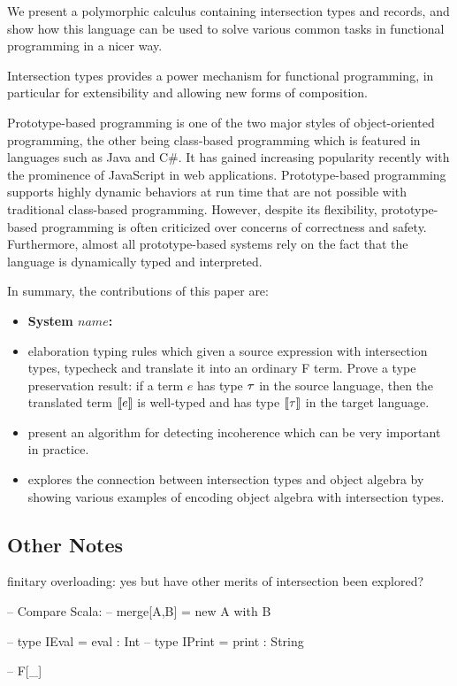 We present a polymorphic calculus containing intersection types and records, and show
how this language can be used to solve various common tasks in functional
programming in a nicer way.

Intersection types provides a power mechanism for functional programming, in
particular for extensibility and allowing new forms of composition.

Prototype-based programming is one of the two major styles of object-oriented
programming, the other being class-based programming which is featured in
languages such as Java and C\#. It has gained increasing popularity recently
with the prominence of JavaScript in web applications. Prototype-based
programming supports highly dynamic behaviors at run time that are not possible
with traditional class-based programming. However, despite its flexibility,
prototype-based programming is often criticized over concerns of correctness and
safety. Furthermore, almost all prototype-based systems rely on the fact that
the language is dynamically typed and interpreted.

In summary, the contributions of this paper are:

\begin{itemize}

\item {\bf System $name$:} 

\item{elaboration typing rules which given a source expression with intersection
    types, typecheck and translate it into an ordinary F term. Prove a type
    preservation result: if a term $ e $ has type $ \tau $ in the source language,
    then the translated term $ \llbracket {e} \rrbracket $ is well-typed and has type $ \llbracket {\tau} \rrbracket $ in the
    target language.}

\item{present an algorithm for detecting incoherence which can be very important
    in practice.}

\item{explores the connection between intersection types and object algebra by
    showing various examples of encoding object algebra with intersection
    types.}

\end{itemize}

\subsection{Other Notes}

finitary overloading: yes
but have other merits of intersection been explored?

-- Compare Scala:
-- merge[A,B] = new A with B

-- type IEval  = { eval :  Int }
-- type IPrint = { print : String }

-- F[\_]
